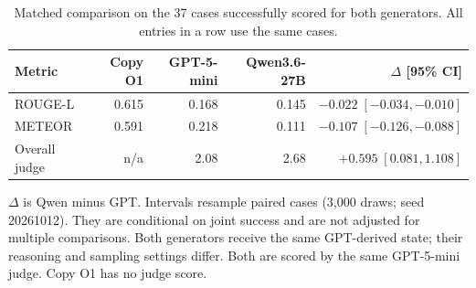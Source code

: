 \begin{table}[t]
\centering
\small
\setlength{\tabcolsep}{6pt}
\renewcommand{\arraystretch}{1.14}
\begin{tabular}{lrrrr}
\toprule
Metric & Copy O1 & GPT-5-mini & Qwen3.6-27B & $\Delta$ [95\% CI] \\
\midrule
ROUGE-L & 0.615 & 0.168 & 0.145 & $-0.022\;[-0.034, -0.010]$ \\
METEOR & 0.591 & 0.218 & 0.111 & $-0.107\;[-0.126, -0.088]$ \\
Overall judge & n/a & 2.08 & 2.68 & $+0.595\;[0.081, 1.108]$ \\
\bottomrule
\end{tabular}
\caption{Matched comparison on the 37 cases successfully scored for both generators. All entries in a row use the same cases.}
\label{tab:cgen-t02}
\vspace{2pt}
\begin{minipage}{\textwidth}
\footnotesize $\Delta$ is Qwen minus GPT. Intervals resample paired cases (3,000 draws; seed 20261012). They are conditional on joint success and are not adjusted for multiple comparisons. Both generators receive the same GPT-derived state; their reasoning and sampling settings differ. Both are scored by the same GPT-5-mini judge. Copy O1 has no judge score.
\end{minipage}
\end{table}
